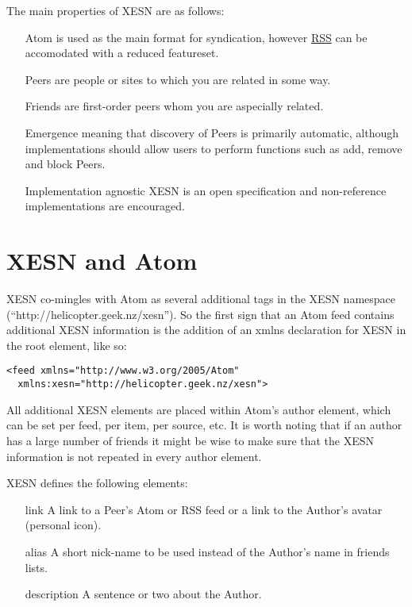 \documentclass[titlepage,english,a4paper,twoside,dvips]{article}
\begin{document}
The main properties of XESN are as follows:

\begin{itemize}

\item[Atom] is used as the main format for syndication, however \href{http://blogs.law.harvard.edu/tech/rss}{RSS} can be accomodated with a reduced featureset.

\item[Peers] are people or sites to which you are related in some way.

\item[Friends] are first-order peers whom you are aspecially related.

\item[Emergence] meaning that discovery of Peers is primarily automatic, although implementations should allow users to perform functions such as add, remove and block Peers.

\item[Implementation agnostic] XESN is an open specification and non-reference implementations are encouraged.

\end{itemize}

\clearpage

\section{XESN and Atom}

XESN co-mingles with Atom as several additional tags in the XESN namespace (``http://helicopter.geek.nz/xesn'').  So the first sign that an Atom feed contains additional XESN information is the addition of an xmlns declaration for XESN in the root element, like so:

\begin{verbatim}
<feed xmlns="http://www.w3.org/2005/Atom" 
  xmlns:xesn="http://helicopter.geek.nz/xesn">
\end{verbatim}

All additional XESN elements are placed within Atom's author element, which can be set per feed, per item, per source, etc.  It is worth noting that if an author has a large number of friends it might be wise to make sure that the XESN information is not repeated in every author element.

XESN defines the following elements:

\begin{itemize}

\item[link] A link to a Peer's Atom or RSS feed or a link to the Author's avatar (personal icon).

\item[alias] A short nick-name to be used instead of the Author's name in friends lists.

\item[description] A sentence or two about the Author.

\end{itemize}
\end{document}
